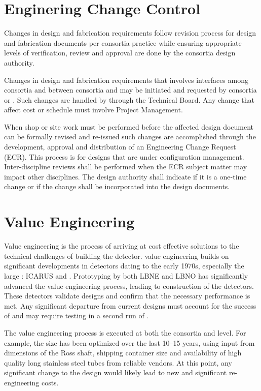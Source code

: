 \section{Enginering Change Control}
\label{sec:fdsp-change}

Changes in design and fabrication requirements follow revision process
for design and fabrication documents per consortia practice while
ensuring appropriate levels of verification, review and approval are
done by the consortia design authority.

Changes in design and fabrication requirements that involves
interfaces among consortia and between consortia and  may be
initiated and requested by consortia or . Such changes are
handled by  through the Technical Board. Any change that
affect cost or schedule must involve Project Management.

When shop or site work must be performed before the affected design
document can be formally revised and re-issued such changes are
accomplished through the development, approval and distribution of an
Engineering Change Request (ECR). This process is for designs that are
under configuration management. Inter-discipline reviews shall be
performed when the ECR subject matter may impact other
disciplines. The design authority shall indicate if it is a one-time
change or if the change shall be incorporated into the design
documents.



\section{Value Engineering}
\label{sec:fdsp-coord-ve}

Value engineering is the process of arriving at cost effective
solutions to the technical challenges of building the 
detector.  value engineering builds on significant
developments in  detectors dating to the early 1970s,
especially the large : ICARUS and
. Prototyping by both LBNE and LBNO has
significantly advanced the value engineering process, leading to
construction of the  detectors. These detectors validate
 designs and confirm that the necessary performance is
met. Any significant departure from current designs must account for
the success of  and may require testing in a second
run of . 

The value engineering process is executed at both the consortia and
 level. For example, the  size has been optimized
over the last 10--15 years, using input from dimensions of the Ross
shaft, shipping container size and availability of high quality long
stainless steel tubes from reliable vendors.  At this point, any
significant change to the  design would likely lead to new
and significant re-engineering costs.

